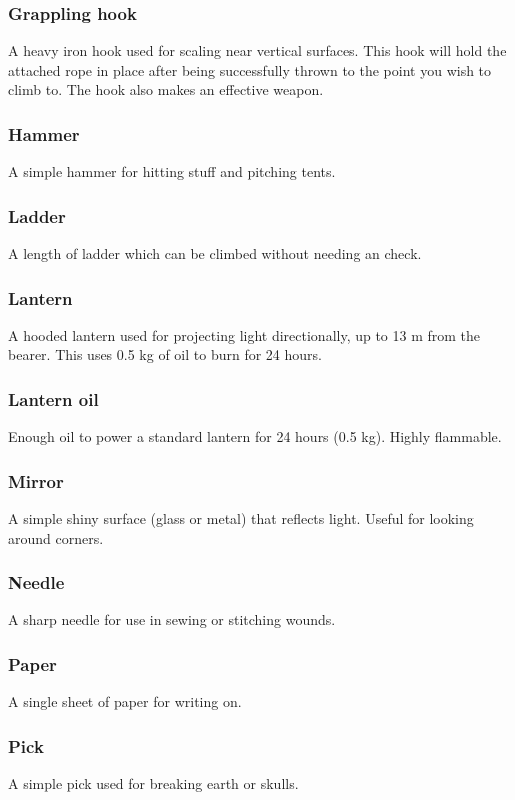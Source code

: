 \documentclass[a4paper,11pt,oneside]{book}
\newcommand{\textlf}[1]{\textbf{\titlecap{#1}}}
\begin{document}
\subsubsection{Grappling hook}
A heavy iron hook used for scaling near vertical surfaces. This hook will hold the attached rope in place after being successfully thrown to the point you wish to climb to. The hook also makes an effective weapon.

\subsubsection{Hammer}
A simple hammer for hitting stuff and pitching tents.

\subsubsection{Ladder}
A length of ladder which can be climbed without needing an \textlf{Athletics} check.

\subsubsection{Lantern}
A hooded lantern used for projecting \textlf{full} light directionally, up to 13 m from the bearer. This uses 0.5 kg of oil to burn for 24 hours.

\subsubsection{Lantern oil}
Enough oil to power a standard lantern for 24 hours (0.5 kg). Highly flammable.

\subsubsection{Mirror}
A simple shiny surface (glass or metal) that reflects light. Useful for looking around corners.

\subsubsection{Needle}
A sharp needle for use in sewing or stitching wounds.

\subsubsection{Paper}
A single sheet of paper for writing on.

\subsubsection{Pick}
A simple pick used for breaking earth or skulls.
\end{document}
